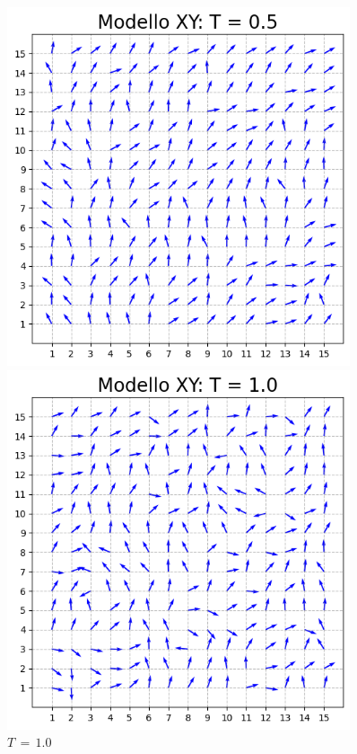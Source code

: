 \begin{figure}[H]
    \centering
    \begin{minipage}{0.45\textwidth}  
      \centering
      \includegraphics[page=1, width=0.9\textwidth]{Immagini/simModelloXY/conf_t0.5.png}
      \caption{$T\,=\,0.5$}
    \end{minipage}\hfill
    \begin{minipage}{0.45\textwidth}  
      \centering
      \includegraphics[page=1, width=0.9\textwidth]{Immagini/simModelloXY/conf_t1.0.png}
      \caption{$T\,=\,1.0$}
    \end{minipage}
    \vspace{12pt}


\end{figure}
